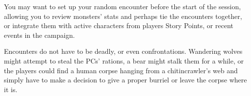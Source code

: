 	You may want to set up your random encounter before the start of the session, allowing you to review monsters' stats and perhaps tie the encounters together, or integrate them with active characters from players Story Points, or recent events in the campaign.

	Encounters do not have to be deadly, or even confrontations.  Wandering wolves might attempt to steal the PCs' rations, a bear might stalk them for a while, or the players could find a human corpse hanging from a chitincrawler's web and simply have to make a decision to give a proper burriel or leave the corpse where it is.


%
%
